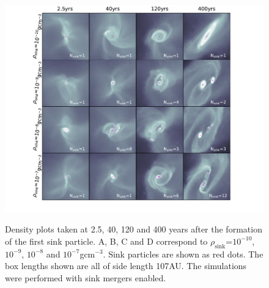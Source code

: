 \documentclass[fleqn,usenatbib]{mnras}
\begin{document}
\begin{figure}
	\hbox{\hspace{-2cm} \includegraphics[scale=1]{grid1.pdf}}
    \caption{Density plots taken at 2.5, 40, 120 and 400 years after the formation of the first sink particle. A, B, C and D correspond to $\rho_{\text{sink}}$=$10^{-10}$,$10^{-9}$, $10^{-8}$ and $10^{-7}$gcm$^{-3}$. Sink particles are shown as red dots. The box lengths shown are all of side length 107AU. The simulations were performed with sink mergers enabled.}
    \label{fig:grid}
\end{figure}
\end{document}
